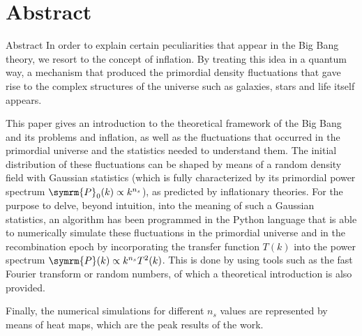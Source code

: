 \section{Abstract}
\begin{frame}[noframenumbering]{Abstract}
    \footnotesize In order to explain certain peculiarities that appear in the Big Bang theory, we resort to the concept of inflation. By treating this idea in a quantum way, a mechanism that produced the primordial density fluctuations that gave rise to the complex structures of the universe such as galaxies, stars and life itself appears.

    This paper gives an introduction to the theoretical framework of the Big Bang and its problems and inflation, as well as the fluctuations that occurred in the primordial universe and the statistics needed to understand them. The initial distribution of these fluctuations can be shaped by means of a random density field with Gaussian statistics (which is fully characterized by its primordial power spectrum \(\symrm{P}_0(k)\propto k^{n_s}\)), as predicted by inflationary theories. For the purpose to delve, beyond intuition, into the meaning of such a Gaussian statistics, an algorithm has been programmed in the Python language that is able to numerically simulate these fluctuations in the primordial universe and in the recombination epoch by incorporating the transfer function \(T(k)\) into the power spectrum \(\symrm{P}(k)\propto k^{n_s}T^2(k)\). This is done by using tools such as the fast Fourier transform or random numbers, of which a theoretical introduction is also provided.
    
    Finally, the numerical simulations for different \(n_s\) values are represented by means of heat maps, which are the peak results of the work.
\end{frame}